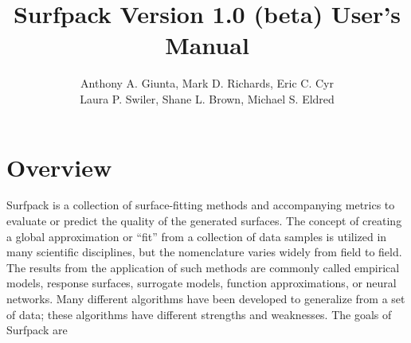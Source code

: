 \documentclass{article}
\begin{document}
\title{Surfpack Version 1.0 (beta) User's Manual}

\author{Anthony A. Giunta, Mark D. Richards, Eric C. Cyr \\Laura P. Swiler, Shane L. Brown, Michael S. Eldred}

\maketitle

\pagebreak

\section {Overview}\label{sec:overview}
Surfpack is a collection of surface-fitting methods and accompanying metrics to evaluate or predict the quality of the generated surfaces.  The concept of creating a global approximation or ``fit'' from a collection of data samples is utilized in many scientific disciplines, but the nomenclature varies widely from field to field.  The results from the application of such methods are commonly called empirical models, response surfaces, surrogate models, function approximations, or neural networks.  Many different algorithms have been developed to generalize from a set of data; these algorithms have different strengths and weaknesses.  The goals of Surfpack are
\end{document}
